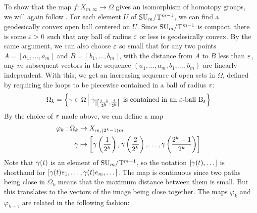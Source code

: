 To show that the map $f : X_{m,\infty} \to \Omega$
gives an isomorphism of homotopy groups, we will again follow
\cite{milnor}. For each element $U$ of $\mathrm{SU}_{m}/\mathrm{T}^{m-1}$, we can find a 
geodesically convex open ball centered on $U$. Since $\mathrm{SU}_{m}/\mathrm{T}^{m-1}$
is compact, there is some $\varepsilon > 0$ such that any ball of radius $\varepsilon$
or less is geodesically convex. By the same argument, we can also
choose $\varepsilon$ so small that for any two points $A= [a_1,\dots, a_m]$ and
$B=[b_1,\dots,b_m]$, with the distance from $A$ to $B$ less
than $\varepsilon$, any $m$ subsequent vectors in the sequence
$(a_1,\dots,a_m,b_1,\dots,b_m)$ are linearly independent.
With this, we get an increasing sequence of open sets in $\Omega$,
defined by requiring the loops to be piecewise contained in a ball of
radius $\varepsilon$:
\[ \Omega_k = \left\{ \gamma \in \Omega \: \Big\vert\:
  \gamma_{\left|\left[ \frac{j-1}{2^k},\frac{j}{2^k} \right]\right.} \text{ is
  contained in an $\varepsilon$-ball $\mathrm{B}_\varepsilon$}  \right\} \]
By the choice of $\varepsilon$ made above, we can define a map
\begin{align*}
  \varphi_k : \Omega_k &\to X_{m,(2^k-1)m} \\
  \gamma &\mapsto \left[ \gamma\left(\frac{1}{2^k}\right),
    \gamma\left(\frac{2}{2^k}\right), \dots,
    \gamma\left(\frac{2^k-1}{2^k}\right) \right]
\end{align*}
Note that $\gamma(t)$ is an element of $\mathrm{SU}_{m}/\mathrm{T}^{m-1}$, so the notation
$[\gamma(t),\dots]$ is shorthand for $[\gamma(t)e_1,\dots,\gamma(t)e_m,\dots]$.
The map is continuous since two paths being close in $\Omega_k$ means
that the maximum distance between them is small. But this translates
to the vectors of the image being close together. The maps $\varphi_k$
and $\varphi_{k+1}$ are related in the following fashion:

